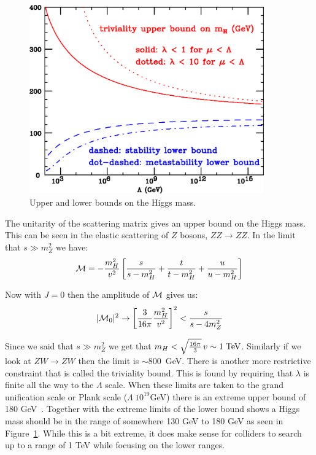 \begin{figure}[htb]
\centering
\includegraphics[width=0.9\textwidth]{StandardModel/bothbounds.eps}
\caption{Upper and lower bounds on the Higgs mass.~\cite{Ridolfi2001} }
\label{fig:bothbounds}
\end{figure}



The unitarity of the scattering matrix gives an upper bound on the Higgs mass.  This can be seen in the elastic scattering of $Z$ bosons, $Z Z \to Z Z$.  In the limit that $s\gg m_Z^2$ we have:
\begin{equation} {\cal M}=-\frac{m_H^2}{v^2}\left[\frac{s}{s-m_H^2}+\frac{t}{t-m_H^2}+\frac{u}{u-m_H^2}\right] \label{eq:unitarity1}\end{equation}

Now with $J=0$ then the amplitude of ${\cal M}$ gives us:
\begin{equation}|{\cal M}_0|^2\to\left[\frac{3}{16\pi}\frac{m_H^2}{v^2}\right]^2<\frac{s}{s-4m_Z^2}\label{eq:unitarity2}\end{equation}

Since we said that $s\gg m_Z^2$ we get that $m_H<\sqrt{\frac{16\pi}{3}}\,v\sim 1\;{\rm TeV}$. Similarly if we look at $Z W \to Z W$ then the limit is $\sim 800$~GeV. There is another more restrictive constraint that is called the triviality bound. This is found by requiring that $\lambda$ is finite all the way to the $\Lambda$ scale.  When these limits are taken to the grand unification scale or Plank scale ($\Lambda ~ 10^{19}$GeV) there is an extreme upper bound of 180 GeV~\cite{Ridolfi2001}.  Together with the extreme limits of the lower bound shows a Higgs mass should be in the range  of somewhere 130 GeV to 180 GeV as seen in Figure~\ref{fig:bothbounds}.  While this is a bit extreme, it does make sense for colliders to search up to a range of 1 TeV while focusing on the lower ranges.

